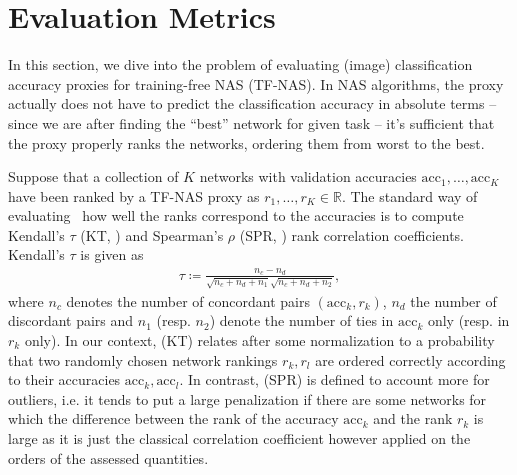 \section{Evaluation Metrics}
\label{sec:evaluationmetrics}

In this section, we dive into the problem of evaluating (image) classification accuracy proxies for training-free NAS (TF-NAS). 
In NAS algorithms, the proxy actually does not have to predict the classification accuracy in absolute terms -- since we are after finding the ``best'' network for given task -- it's sufficient that the proxy properly ranks the networks, ordering them from worst to the best.

Suppose that a collection of $K$ networks with validation accuracies $\text{acc}_1, \dots, \text{acc}_K$ have been ranked by a TF-NAS proxy as $r_1,\dots,r_K\in\mathbb{R}$. The standard way of evaluating~\cite{li2023zico, lee2024az,kadlecova2024surprisingly} how well the ranks correspond to the accuracies is to compute Kendall’s $\tau$ (KT, \cite{kendall1938new}) and Spearman’s $\rho$ (SPR, \cite{spearman1961proof}) rank correlation coefficients. Kendall's $\tau$ is given as
\begin{align}
    \tau\coloneq\frac{n_c-n_d}{\sqrt{n_c+n_d+n_1}\sqrt{n_c+n_d+n_2}},
\end{align}
where $n_c$ denotes the number of concordant pairs $\left(\text{acc}_k, r_k\right)$, $n_d$ the number of discordant pairs and $n_1$ (resp. $n_2$) denote the number of ties in $\text{acc}_k$ only (resp. in $r_k$ only). In our context, (KT) relates after some normalization to a probability that two randomly chosen network rankings $r_k, r_l$ are ordered correctly according to their accuracies $\text{acc}_k, \text{acc}_l$. In contrast, (SPR) is defined to account more for outliers, i.e. it tends to put a large penalization if there are some networks for which the difference between the rank of the accuracy $\text{acc}_k$ and the rank $r_k$ is large as it is just the classical correlation coefficient however applied on the orders of the assessed quantities.

